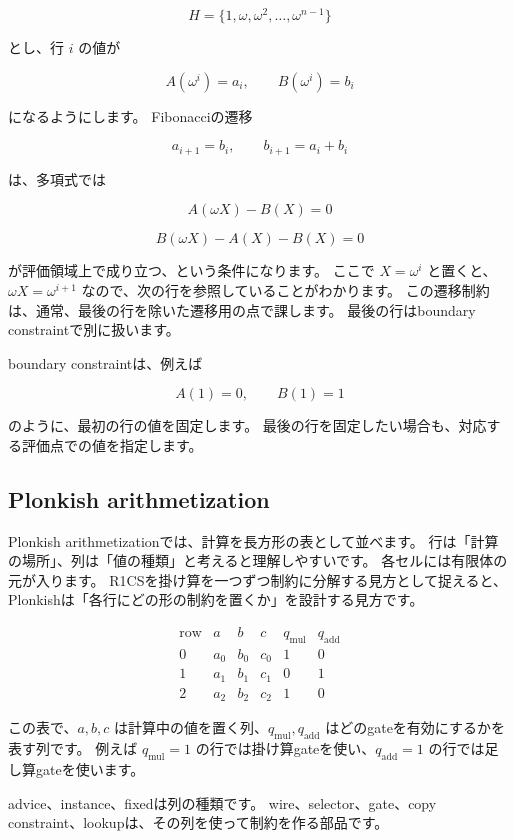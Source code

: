 \documentclass[a4paper,11pt]{ltjsarticle}
\begin{document}
\[
  H=\{1,\omega,\omega^2,\ldots,\omega^{n-1}\}
\]

とし、行 \(i\) の値が

\[
  A(\omega^i)=a_i,\qquad B(\omega^i)=b_i
\]

になるようにします。
Fibonacciの遷移

\[
  a_{i+1}=b_i,\qquad b_{i+1}=a_i+b_i
\]

は、多項式では

\[
  A(\omega X)-B(X)=0
\]

\[
  B(\omega X)-A(X)-B(X)=0
\]

が評価領域上で成り立つ、という条件になります。
ここで \(X=\omega^i\) と置くと、\(\omega X=\omega^{i+1}\) なので、次の行を参照していることがわかります。
この遷移制約は、通常、最後の行を除いた遷移用の点で課します。
最後の行はboundary constraintで別に扱います。

boundary constraintは、例えば

\[
  A(1)=0,\qquad B(1)=1
\]

のように、最初の行の値を固定します。
最後の行を固定したい場合も、対応する評価点での値を指定します。

\subsection{Plonkish arithmetization}

Plonkish arithmetizationでは、計算を長方形の表として並べます。
行は「計算の場所」、列は「値の種類」と考えると理解しやすいです。
各セルには有限体の元が入ります。
R1CSを掛け算を一つずつ制約に分解する見方として捉えると、Plonkishは「各行にどの形の制約を置くか」を設計する見方です。

\[
\begin{array}{c|ccc|cc}
\text{row} & a & b & c & q_{\mathrm{mul}} & q_{\mathrm{add}}\\
\hline
0 & a_0 & b_0 & c_0 & 1 & 0\\
1 & a_1 & b_1 & c_1 & 0 & 1\\
2 & a_2 & b_2 & c_2 & 1 & 0
\end{array}
\]

この表で、\(a,b,c\) は計算中の値を置く列、\(q_{\mathrm{mul}},q_{\mathrm{add}}\) はどのgateを有効にするかを表す列です。
例えば \(q_{\mathrm{mul}}=1\) の行では掛け算gateを使い、\(q_{\mathrm{add}}=1\) の行では足し算gateを使います。

advice、instance、fixedは列の種類です。
wire、selector、gate、copy constraint、lookupは、その列を使って制約を作る部品です。
\end{document}
